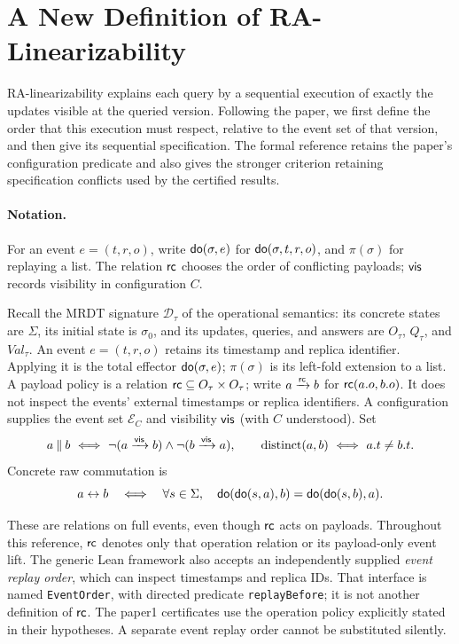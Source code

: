 \section{A New Definition of RA-Linearizability}
\label{sec:semantics}

RA-linearizability explains each query by a sequential execution of exactly
the updates visible at the queried version. Following the paper, we first
define the order that this execution must respect, relative to the event set
of that version, and then give its sequential specification. The formal
reference retains the paper's configuration predicate and also gives the
stronger criterion retaining specification conflicts used by the certified results.

\paragraph{Notation.}
For an event $e=(t,r,o)$, write $\mathsf{do}(\sigma,e)$ for
$\mathsf{do}(\sigma,t,r,o)$, and
$\pi(\sigma)$ for replaying a list.
The relation $\mathsf{rc}$ chooses the order of conflicting payloads;
$\mathsf{vis}$ records visibility in configuration $C$.

\begin{definition}
\label{def:events}
Recall the MRDT signature $\mathcal D_\tau$ of the operational semantics:
its concrete states are $\Sigma$, its initial state is $\sigma_0$, and its
updates, queries, and answers are $O_\tau$, $Q_\tau$, and $Val_\tau$.
An event $e=(t,r,o)$ retains its timestamp and replica identifier.
Applying it is the total effector $\mathsf{do}(\sigma,e)$; $\pi(\sigma)$ is
its left-fold extension to a list.
A payload policy is a relation $\mathsf{rc}\subseteq O_\tau\times O_\tau$; write
$a\xrightarrow{\mathsf{rc}}b$ for $\mathsf{rc}(a.o,b.o)$. It does not inspect the events' external
timestamps or replica identifiers.
A configuration supplies the event set $\mathcal E_C$ and visibility $\mathsf{vis}$ (with $C$ understood). Set
\[
 a\conc b\ \Longleftrightarrow\
 \neg(a\vis b)\land\neg(b\vis a),\qquad
 \operatorname{distinct}(a,b)\ \Longleftrightarrow\ a.t\ne b.t.
\]
Concrete raw commutation is
\[
 a\leftrightarrow b\quad\Longleftrightarrow\quad
 \forall s\in\Sigma,\quad \mathsf{do}(\mathsf{do}(s,a),b)=\mathsf{do}(\mathsf{do}(s,b),a).
\]
\end{definition}
These are relations on full events, even though $\mathsf{rc}$ acts on payloads.
Throughout this reference, $\mathsf{rc}$ denotes only that operation relation or
its payload-only event lift. The generic Lean framework also accepts an
independently supplied \emph{event replay order}, which can inspect timestamps
and replica IDs. That interface is named \texttt{EventOrder}, with directed
predicate \texttt{replayBefore}; it is not another definition of $\mathsf{rc}$.
The paper1 certificates use the operation policy explicitly stated in their
hypotheses. A separate event replay order cannot be substituted silently.


